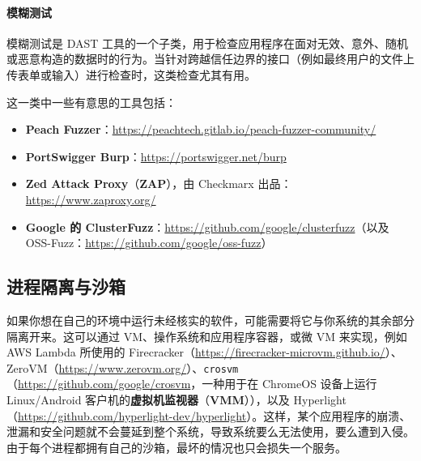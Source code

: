 \paragraph{模糊测试}

\label{idx:1113}
\label{idx:1114}
模糊测试是 DAST 工具的一个子类，用于检查应用程序在面对无效、意外、随机或恶意构造的数据时的行为。当针对跨越信任边界的接口（例如最终用户的文件上传表单或输入）进行检查时，这类检查尤其有用。

\label{idx:1115}
\label{idx:1116}
\label{idx:1117}
\label{idx:1118}
这一类中一些有意思的工具包括：

\begin{itemize}
\item \textbf{Peach Fuzzer}：\href{https://peachtech.gitlab.io/peach-fuzzer-community/}{https://peachtech.gitlab.io/peach-fuzzer-community/}
\item \textbf{PortSwigger Burp}：\href{https://portswigger.net/burp}{https://portswigger.net/burp}
\item \textbf{Zed Attack Proxy}（\textbf{ZAP}），由 Checkmarx 出品：\href{https://www.zaproxy.org/}{https://www.zaproxy.org/}
\item \textbf{Google 的 ClusterFuzz}：\href{https://github.com/google/clusterfuzz}{https://github.com/google/clusterfuzz}（以及 OSS-Fuzz：\href{https://github.com/google/oss-fuzz}{https://github.com/google/oss-fuzz}）
\end{itemize}

\subsection{进程隔离与沙箱}

\label{idx:1119}
\label{idx:1120}
\label{idx:1121}
\label{idx:1122}
\label{idx:1123}
如果你想在自己的环境中运行未经核实的软件，可能需要将它与你系统的其余部分隔离开来。这可以通过 VM、操作系统和应用程序容器，或微 VM 来实现，例如 AWS Lambda 所使用的 Firecracker（\href{https://firecracker-microvm.github.io/}{https://firecracker-microvm.github.io/}）、ZeroVM（\href{https://www.zerovm.org/}{https://www.zerovm.org/}）、\texttt{crosvm}（\href{https://github.com/google/crosvm}{https://github.com/google/crosvm}，一种用于在 ChromeOS 设备上运行 Linux/Android 客户机的\textbf{虚拟机监视器}（\textbf{VMM}）），以及 Hyperlight（\href{https://github.com/hyperlight-dev/hyperlight}{https://github.com/hyperlight-dev/hyperlight}）。这样，某个应用程序的崩溃、泄漏和安全问题就不会蔓延到整个系统，导致系统要么无法使用，要么遭到入侵。由于每个进程都拥有自己的沙箱，最坏的情况也只会损失一个服务。

